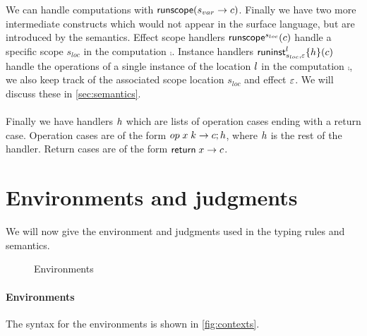 {We can handle computations with $\mathsf{runscope} ( s_{var} \rightarrow c )$.
Finally we have two more intermediate constructs which would not appear in the surface language, but are introduced by the semantics.
Effect scope handlers $\mathsf{runscope}^{s_{loc}} ( c )$ handle a specific scope $s_{loc}$ in the computation $\comp$.
Instance handlers $\mathsf{runinst}^{l}_{s_{loc},\varepsilon} \{ h \} ( c )$ handle the operations of a single instance of the location $l$ in the computation $\comp$, we also keep track of the associated scope location $s_{loc}$ and effect $\varepsilon$.
We will discuss these in \cref{sec:semantics}.
\\\\
Finally we have handlers $h$ which are lists of operation cases ending with a return case.
Operation cases are of the form $op \; x \; k \rightarrow c ; h$, where $h$ is the rest of the handler.
Return cases are of the form $\mathsf{return} \; x \rightarrow c$.

\section{Environments and judgments}
\label{sec:contexts}
We will now give the environment and judgments used in the typing rules and semantics.

\begin{figure}[h]
\caption{Environments}
\centering
{}
\end{figure}

\paragraph{Environments}
The syntax for the environments is shown in \cref{fig:contexts}.

}

